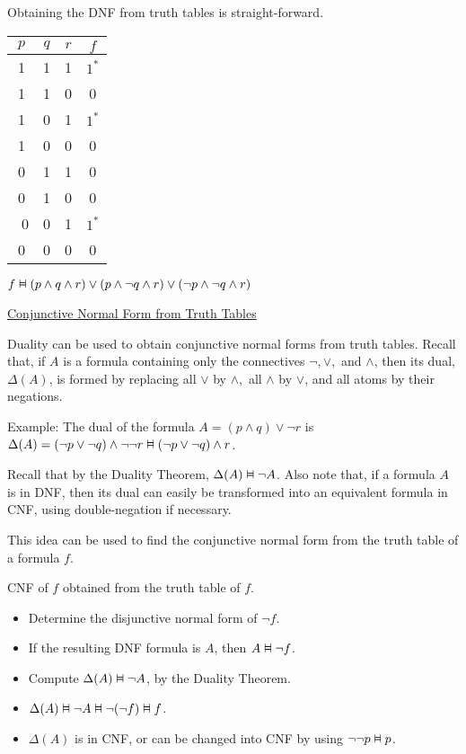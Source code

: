 \documentclass{article}
\newcommand{\vDashv}{%
  \mathrel{%
    \text{%
      \ooalign{$\vDash$\cr\reflectbox{$\vDash$}\cr}%
    }%
  }%
}
\begin{document}
Obtaining the DNF from truth tables is straight-forward.

\begin{table}[h]
    \centering
    \begin{tabular}{|ccc|c|} \hline
         $p$& $q$ & $r$ & $f$\\ \hline
         1&  1&  1& $1^*$\\
         1&  1&  0& 0\\
         1&  0&  1& $1^*$\\
         1&  0&  0& 0\\
         0&  1&  1& 0\\
         0&  1&  0& 0\\\
         0&  0&  1& $1^*$\\
         0&  0&  0& 0\\\hline
    \end{tabular}
\end{table}
\begin{center}
$f \vDashv (p \wedge q \wedge r) \vee (p \wedge \neg q \wedge r) \vee (\neg p \wedge \neg q \wedge r)$
\end{center}

\underline{Conjunctive Normal Form from Truth Tables}

Duality can be used to obtain conjunctive normal forms from truth tables. Recall that, if $A$ is a formula containing only the connectives $\neg, \vee, $ and $\wedge$, then its dual, $\Delta(A)$, is formed by replacing all $\vee$ by $\wedge, $ all $\wedge$ by $\vee$, and all atoms by their negations. 

Example: The dual of the formula $A = (p \wedge q) \vee \neg r$ is $\Delta(A) = (\neg p \vee \neg q) \wedge \neg \neg r \vDashv (\neg p \vee \neg q) \wedge r$. 

Recall that by the Duality Theorem, $\Delta(A) \vDashv \neg A$. Also note that, if a formula $A$ is in DNF, then its dual can easily be transformed into an equivalent formula in CNF, using double-negation if necessary. 

This idea can be used to find the conjunctive normal form from the truth table of a formula $f$. 

CNF of $f$ obtained from the truth table of $f$. 
\begin{itemize}
    \item Determine the disjunctive normal form of $\neg f$. 
    \item If the resulting DNF formula is $A$, then $A \vDashv \neg f$. 
    \item Compute $\Delta(A) \vDashv \neg A$, by the Duality Theorem.
    \item $\Delta(A) \vDashv \neg A \vDashv \neg(\neg f) \vDashv f$.
    \item $\Delta(A)$ is in CNF, or can be changed into CNF by using $\neg \neg p \vDashv p$. 
\end{itemize}
\end{document}
